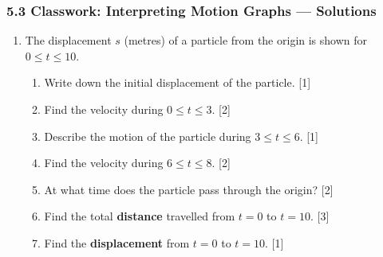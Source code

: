 \documentclass[12pt, twoside]{article}
\begin{document}
\subsubsection*{5.3 Classwork: Interpreting Motion Graphs --- Solutions}

\begin{enumerate}[itemsep=0.4cm]

\item The displacement $s$ (metres) of a particle from the origin is shown
      for $0 \leq t \leq 10$.

\begin{center}
\vspace{-0.3cm}
\vspace{-0.3cm}
\end{center}

\begin{enumerate}[itemsep=0.1cm]
  \item Write down the initial displacement of the particle. \hfill [1]
  \item Find the velocity during $0 \leq t \leq 3$. \hfill [2]
  \item Describe the motion of the particle during $3 \leq t \leq 6$. \hfill [1]
  \item Find the velocity during $6 \leq t \leq 8$. \hfill [2]
  \item At what time does the particle pass through the origin? \hfill [2]
  \item Find the total \textbf{distance} travelled from $t = 0$ to $t = 10$. \hfill [3]
  \item Find the \textbf{displacement} from $t = 0$ to $t = 10$. \hfill [1]
\end{enumerate}

\vfill


\end{enumerate}
\end{document}
